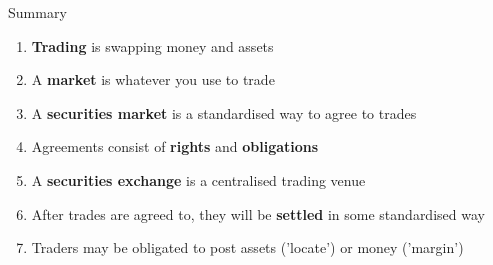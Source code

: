 \documentclass{beamer}
\begin{document}
\begin{frame}{Summary}
	\begin{enumerate}
		\item \textbf{Trading} is swapping money and assets
		\item A \textbf{market} is whatever you use to trade
		\item A \textbf{securities market} is a standardised way to agree to trades
		\item Agreements consist of \textbf{rights} and \textbf{obligations}
		\item A \textbf{securities exchange} is a centralised trading venue %
		\item After trades are agreed to, they will be \textbf{settled} in some standardised way
		\item Traders may be obligated to post assets ('locate') or money ('margin')
	\end{enumerate}
\end{frame}
\end{document}
